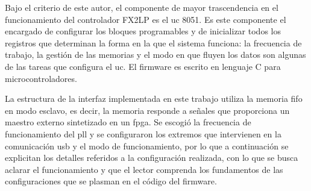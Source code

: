 %
%

%
%
%

Bajo el criterio de este autor, el componente de mayor trascendencia en el funcionamiento del controlador FX2LP es el \acrshort{uc} 8051. Es este componente el encargado de configurar los bloques programables y de inicializar todos los registros que determinan la forma en la que el sistema funciona: la frecuencia de trabajo, la gestión de las memorias y el modo en que fluyen los datos son algunas de las tareas que configura el \acrshort{uc}. El firmware es escrito en lenguaje C para microcontroladores. 

La estructura de la interfaz implementada en este trabajo utiliza la memoria \acrshort{fifo} en modo esclavo, es decir, la memoria responde a señales que proporciona un maestro externo sintetizado en un \acrshort{fpga}. Se escogió la frecuencia de funcionamiento del \acrshort{pll} y se configuraron los extremos que intervienen en la comunicación \acrshort{usb} y el modo de funcionamiento, por lo que a continuación se explicitan los detalles referidos a la configuración realizada, con lo que se busca aclarar el funcionamiento y que el lector comprenda los fundamentos de las configuraciones que se plasman en el código del firmware.


